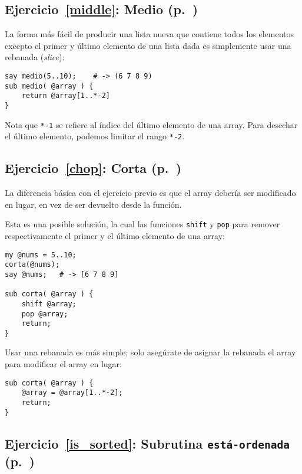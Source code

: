 \subsection{Ejercicio~\ref{middle}: Medio (p.~\pageref{middle})}
\label{sol_middle}

La forma más fácil de producir una lista nueva que contiene
todos los elementos excepto el primer y último elemento de
una lista dada es simplemente usar una rebanada (\emph{slice}):

\begin{verbatim}
say medio(5..10);    # -> (6 7 8 9)
sub medio( @array ) { 
    return @array[1..*-2] 
}
\end{verbatim}

Nota que \verb|*-1| se refiere al índice del último elemento
de una array. Para desechar el último elemento, podemos limitar 
el rango \verb|*-2|.

\subsection{Ejercicio~\ref{chop}: Corta (p.~\pageref{chop})}
\label{sol_chop}

La diferencia básica con el ejercicio previo es que 
el array debería ser modificado en lugar, en vez de 
ser devuelto desde la función.

Esta es una posible solución, la cual las funciones
{\tt shift} y {\tt pop} para remover respectivamente el primer y
el último elemento de una array:

\begin{verbatim}
my @nums = 5..10;
corta(@nums); 
say @nums;   # -> [6 7 8 9]

sub corta( @array ) { 
    shift @array; 
    pop @array; 
    return;
}
\end{verbatim}

Usar una rebanada es más simple; solo asegúrate de asignar
la rebanada el array para modificar el array en lugar:

\begin{verbatim}
sub corta( @array ) { 
    @array = @array[1..*-2];
    return;
}
\end{verbatim}
%

\subsection{Ejercicio~\ref{is_sorted}: Subrutina {\tt está-ordenada} (p.~\pageref{is_sorted})}
\label{sol_is_sorted}

